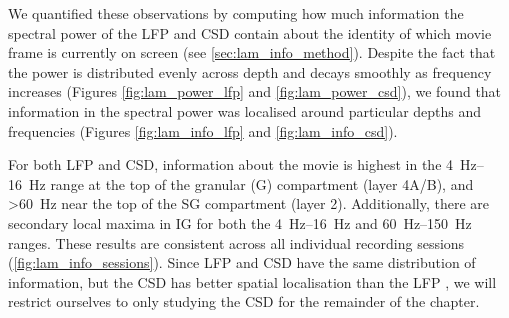 We quantified these observations by computing how much information the spectral power of the \ac{LFP} and \ac{CSD} contain about the identity of which movie frame is currently on screen (see \autoref{sec:lam_info_method}).
Despite the fact that the power is distributed evenly across depth and decays smoothly as frequency increases (Figures \ref{fig:lam_power_lfp} and \ref{fig:lam_power_csd}), we found that information in the spectral power was localised around particular depths and frequencies (Figures \ref{fig:lam_info_lfp} and \ref{fig:lam_info_csd}).

For both \ac{LFP} and \ac{CSD}, information about the movie is highest in the \SIrange{4}{16}{Hz} range at the top of the granular (\acs{G}) compartment (layer 4A/B), and \SI{>60}{Hz} near the top of the \ac{SG} compartment (layer 2).
Additionally, there are secondary local maxima in \ac{IG} for both the \SIrange{4}{16}{Hz} and \SIrange{60}{150}{Hz} ranges.
These results are consistent across all individual recording sessions (\autoref{fig:lam_info_sessions}).
Since \ac{LFP} and \ac{CSD} have the same distribution of information, but the \ac{CSD} has better spatial localisation than the \ac{LFP} \citep{Einevoll2013,Kajikawa2011}, we will restrict ourselves to only studying the \ac{CSD} for the remainder of the chapter.

